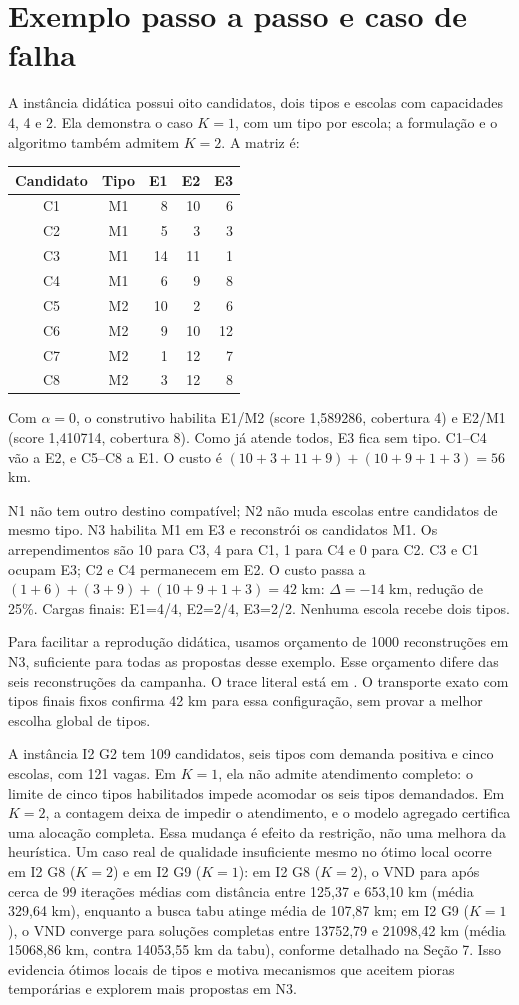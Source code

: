 \documentclass[12pt]{article}
\begin{document}
\section{Exemplo passo a passo e caso de falha}
\label{sec:exemplo}
A instância didática  possui oito candidatos, dois tipos e escolas com capacidades 4, 4 e 2. Ela demonstra o caso $K=1$, com um tipo por escola; a formulação e o algoritmo também admitem $K=2$. A matriz é:
\begin{center}\begin{tabular}{ccrrr}
\toprule Candidato & Tipo & E1 & E2 & E3\\\midrule
C1&M1&8&10&6\\C2&M1&5&3&3\\C3&M1&14&11&1\\C4&M1&6&9&8\\
C5&M2&10&2&6\\C6&M2&9&10&12\\C7&M2&1&12&7\\C8&M2&3&12&8\\\bottomrule
\end{tabular}\end{center}
Com $\alpha=0$, o construtivo habilita E1/M2 (score 1,589286, cobertura 4) e E2/M1 (score 1,410714, cobertura 8). Como já atende todos, E3 fica sem tipo. C1--C4 vão a E2, e C5--C8 a E1. O custo é $(10+3+11+9)+(10+9+1+3)=56$ km.

N1 não tem outro destino compatível; N2 não muda escolas entre candidatos de mesmo tipo. N3 habilita M1 em E3 e reconstrói os candidatos M1. Os arrependimentos são 10 para C3, 4 para C1, 1 para C4 e 0 para C2. C3 e C1 ocupam E3; C2 e C4 permanecem em E2. O custo passa a $(1+6)+(3+9)+(10+9+1+3)=42$ km: $\Delta=-14$ km, redução de 25\%. Cargas finais: E1=4/4, E2=2/4, E3=2/2. Nenhuma escola recebe dois tipos.

Para facilitar a reprodução didática, usamos orçamento de 1000 reconstruções em N3, suficiente para todas as propostas desse exemplo. Esse orçamento difere das seis reconstruções da campanha. O trace literal está em . O transporte exato com tipos finais fixos confirma 42 km para essa configuração, sem provar a melhor escolha global de tipos.

A instância I2 G2 tem 109 candidatos, seis tipos com demanda positiva e cinco escolas, com 121 vagas. Em $K=1$, ela não admite atendimento completo: o limite de cinco tipos habilitados impede acomodar os seis tipos demandados. Em $K=2$, a contagem deixa de impedir o atendimento, e o modelo agregado certifica uma alocação completa. Essa mudança é efeito da restrição, não uma melhora da heurística. Um caso real de qualidade insuficiente mesmo no ótimo local ocorre em I2 G8 ($K=2$) e em I2 G9 ($K=1$): em I2 G8 ($K=2$), o VND para após cerca de 99 iterações médias com distância entre 125,37 e 653,10 km (média 329,64 km), enquanto a busca tabu atinge média de 107,87 km; em I2 G9 ($K=1$), o VND converge para soluções completas entre 13752,79 e 21098,42 km (média 15068,86 km, contra 14053,55 km da tabu), conforme detalhado na Seção 7. Isso evidencia ótimos locais de tipos e motiva mecanismos que aceitem pioras temporárias e explorem mais propostas em N3.
\end{document}
